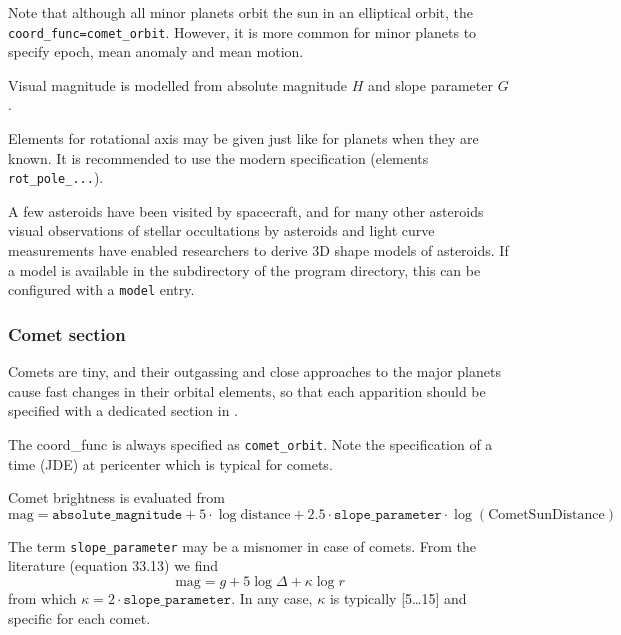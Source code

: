 Note that although all minor planets orbit the sun in an
elliptical orbit, the \texttt{coord\_func=comet\_orbit}. However, it
is more common for minor planets to specify epoch, mean anomaly and
mean motion.

Visual magnitude is modelled from absolute magnitude $H$ and slope parameter $G$.

Elements for rotational axis may be given just like for planets when
they are known. It is recommended to use the modern specification
(elements \texttt{rot\_pole\_...}).

A few asteroids have been visited by spacecraft, 
and for many other asteroids visual observations of stellar occultations 
by asteroids and light curve measurements have enabled researchers to derive 
3D shape models of asteroids. If a model is available in the  
subdirectory of the program directory, this can be configured with a \texttt{model} entry.

\subsubsection{Comet section}
\label{sec:ssystem.ini:Comet}

Comets are tiny, and their outgassing and close approaches to the
major planets cause fast changes in their orbital elements, so that
each apparition should be specified with a dedicated section in
.

The coord\_func is always specified as \texttt{comet\_orbit}.  Note the
specification of a time (JDE) at pericenter which is typical for
comets.

Comet brightness is evaluated from
\begin{equation}
  \label{eq:comet_magnitudes}
  \mathrm{mag}=\mathtt{absolute\_magnitude}+5\cdot\log{\mathrm{distance}} + 2.5\cdot\mathtt{slope\_parameter}\cdot\log(\mathrm{CometSunDistance})
\end{equation}

The term \texttt{slope\_parameter} may be a misnomer in case of
comets. From the literature \citep{AstronomicalAlgorithms:1998} (equation 33.13) we find
\begin{equation}
  \label{eq:comet_magnitudes_Meeus}
  \mathrm{mag}=g+5\log\Delta + \kappa\log r
\end{equation}
from which $\kappa=2\cdot\mathtt{slope\_parameter}$. In any case, $\kappa$ is typically [5\ldots15] and specific for each comet.


